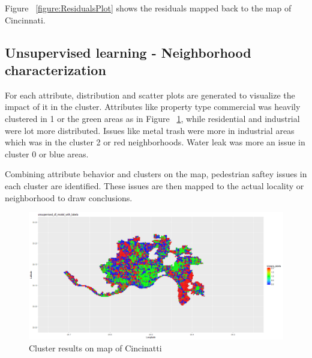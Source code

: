 \documentclass{llncs}
\begin{document}
Figure ~\ref{figure:ResidualsPlot} shows the residuals mapped back to the map of Cincinnati.

\subsection{Unsupervised learning - Neighborhood characterization}

For each attribute, distribution and scatter plots are generated to visualize the impact of it in the cluster. Attributes like property type commercial was heavily clustered in 1 or the green areas as in Figure ~\ref{figure:kmeansongrid}, while residential and industrial were lot more distributed. Issues like metal trash were more in industrial areas which was in the cluster 2 or red neighborhoods. Water leak was more an issue in cluster 0 or blue areas.

Combining attribute behavior and clusters on the map, pedestrian saftey issues in each cluster are identified. These issues are then mapped to the actual locality or neighborhood to draw conclusions.

\FloatBarrier
\begin{figure}
 	\includegraphics[width=\textwidth, height=\textheight, keepaspectratio]{kmeansongrid.png}
 	\caption{Cluster results on map of Cincinatti}
	\label{figure:kmeansongrid}
\end{figure}
\FloatBarrier
\end{document}
